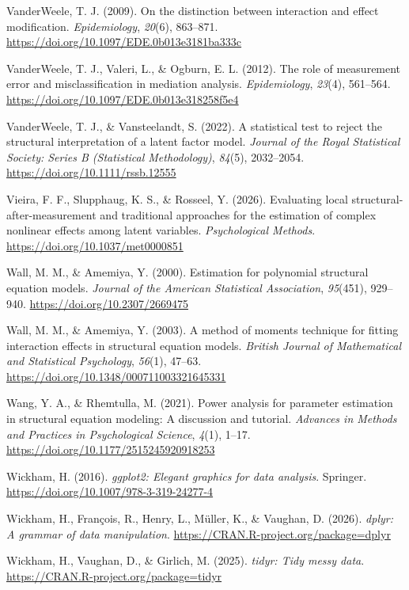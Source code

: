 \documentclass[
  man,
  longtable,
  nolmodern,
  notxfonts,
  notimes,
  colorlinks=true,linkcolor=blue,citecolor=blue,urlcolor=blue]{apa7}
\newlength{\cslhangindent}
\newenvironment{CSLReferences}[2] %
 {\begin{list}{}{%
  \setlength{\itemindent}{0pt}
  \setlength{\leftmargin}{0pt}
  \setlength{\parsep}{0pt}
  \ifodd #1
   \setlength{\leftmargin}{\cslhangindent}
   \setlength{\itemindent}{-1\cslhangindent}
  \fi
  \setlength{\itemsep}{#2\baselineskip}}}
 {\end{list}}
\begin{document}
\begin{CSLReferences}{1}{0}
VanderWeele, T. J. (2009). On the distinction between interaction and
effect modification. \emph{Epidemiology}, \emph{20}(6), 863--871.
\url{https://doi.org/10.1097/EDE.0b013e3181ba333c}

VanderWeele, T. J., Valeri, L., \& Ogburn, E. L. (2012). The role of
measurement error and misclassification in mediation analysis.
\emph{Epidemiology}, \emph{23}(4), 561--564.
\url{https://doi.org/10.1097/EDE.0b013e318258f5e4}

VanderWeele, T. J., \& Vansteelandt, S. (2022). A statistical test to
reject the structural interpretation of a latent factor model.
\emph{Journal of the Royal Statistical Society: Series B (Statistical
Methodology)}, \emph{84}(5), 2032--2054.
\url{https://doi.org/10.1111/rssb.12555}

Vieira, F. F., Slupphaug, K. S., \& Rosseel, Y. (2026). Evaluating local
structural-after-measurement and traditional approaches for the
estimation of complex nonlinear effects among latent variables.
\emph{Psychological Methods}. \url{https://doi.org/10.1037/met0000851}

Wall, M. M., \& Amemiya, Y. (2000). Estimation for polynomial structural
equation models. \emph{Journal of the American Statistical Association},
\emph{95}(451), 929--940. \url{https://doi.org/10.2307/2669475}

Wall, M. M., \& Amemiya, Y. (2003). A method of moments technique for
fitting interaction effects in structural equation models. \emph{British
Journal of Mathematical and Statistical Psychology}, \emph{56}(1),
47--63. \url{https://doi.org/10.1348/000711003321645331}

Wang, Y. A., \& Rhemtulla, M. (2021). Power analysis for parameter
estimation in structural equation modeling: A discussion and tutorial.
\emph{Advances in Methods and Practices in Psychological Science},
\emph{4}(1), 1--17. \url{https://doi.org/10.1177/2515245920918253}

Wickham, H. (2016). \emph{{ggplot2}: Elegant graphics for data
analysis}. Springer. \url{https://doi.org/10.1007/978-3-319-24277-4}

Wickham, H., François, R., Henry, L., Müller, K., \& Vaughan, D. (2026).
\emph{{dplyr}: A grammar of data manipulation}.
\url{https://CRAN.R-project.org/package=dplyr}

Wickham, H., Vaughan, D., \& Girlich, M. (2025). \emph{{tidyr}: Tidy
messy data}. \url{https://CRAN.R-project.org/package=tidyr}

\end{CSLReferences}
\end{document}
